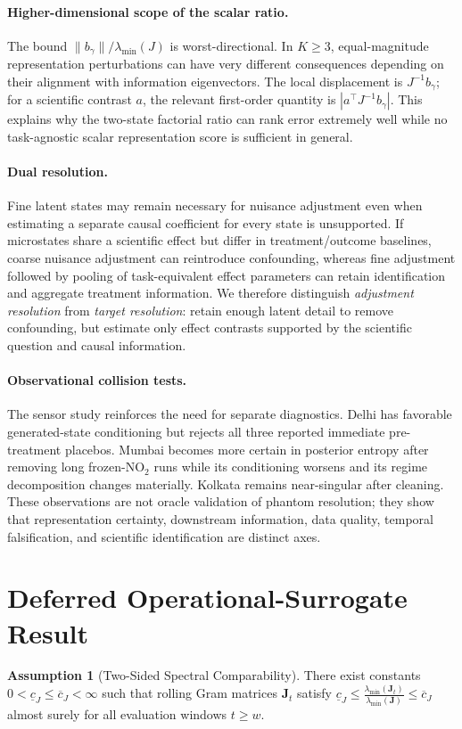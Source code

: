 \documentclass[twoside]{article}
\theoremstyle{definition}
\newtheorem{assumption}{Assumption}
\begin{document}
\paragraph{Higher-dimensional scope of the scalar ratio.}
The bound $\|b_\gamma\|/\lambda_{\min}(J)$ is worst-directional. In $K\ge3$, equal-magnitude representation perturbations can have very different consequences depending on their alignment with information eigenvectors. The local displacement is $J^{-1}b_\gamma$; for a scientific contrast $a$, the relevant first-order quantity is $|a^\top J^{-1}b_\gamma|$. This explains why the two-state factorial ratio can rank error extremely well while no task-agnostic scalar representation score is sufficient in general.

\paragraph{Dual resolution.}
Fine latent states may remain necessary for nuisance adjustment even when estimating a separate causal coefficient for every state is unsupported. If microstates share a scientific effect but differ in treatment/outcome baselines, coarse nuisance adjustment can reintroduce confounding, whereas fine adjustment followed by pooling of task-equivalent effect parameters can retain identification and aggregate treatment information. We therefore distinguish \emph{adjustment resolution} from \emph{target resolution}: retain enough latent detail to remove confounding, but estimate only effect contrasts supported by the scientific question and causal information.

\paragraph{Observational collision tests.}
The sensor study reinforces the need for separate diagnostics. Delhi has favorable generated-state conditioning but rejects all three reported immediate pre-treatment placebos. Mumbai becomes more certain in posterior entropy after removing long frozen-$\mathrm{NO}_2$ runs while its conditioning worsens and its regime decomposition changes materially. Kolkata remains near-singular after cleaning. These observations are not oracle validation of phantom resolution; they show that representation certainty, downstream information, data quality, temporal falsification, and scientific identification are distinct axes.



\section{Deferred Operational-Surrogate Result}
\label{app:bridge_full}
\begin{assumption}[Two-Sided Spectral Comparability]
\label{ass:spectral_comparability}
There exist constants $0 < \underline{c}_J \le \overline{c}_J < \infty$ such that rolling Gram matrices $\boldsymbol{J}_t$ satisfy $\underline{c}_J \le \frac{\lambda_{\min}(\boldsymbol{J}_t)}{\lambda_{\min}(\boldsymbol{J})} \le \overline{c}_J$ almost surely for all evaluation windows $t \ge w$.
\end{assumption}
\end{document}
